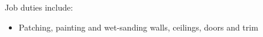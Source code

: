 \normalsize
Job duties include:
\small\begin{itemize}
    \item Patching, painting and wet-sanding walls, ceilings, doors and trim
\end{itemize}
\normalsize
\medskip
